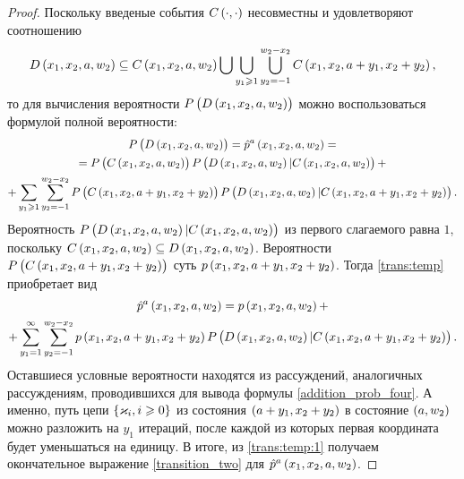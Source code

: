 \documentclass[a4paper,14pt,russian]{article}
\newcommand{\Markk}[0]{\brrr{ \vk_i, i \geqslant 0}}
\newcommand{\p}{\hat{p}}
\begin{document}
\begin{proof}
Поскольку введеные события $C\left(\cdot,\cdot\right)$ несовместны и
удовлетворяют соотношению
\begin{equation*}
 D\left(x_1,x_2, a , w_2\right) \subseteq C\left(x_1,x_2, a , w_2\right)
 \bigcup \bigcup_{y_1 \geqslant  1} \bigcup_{y_2 = -1}^{w_2-x_2} C\left(x_1,x_2, a +y_1, x_2 + y_2\right),
\end{equation*}
то для вычисления вероятности $ P\left(D\left(x_1,x_2, a , w_2\right)\right)$ можно воспользоваться формулой полной вероятности:
\begin{multline}
P\br{D\br{x_1,x_2, a , w_2}} =  \p^a \br{x_1, x_2, a, w_2} =\\=
 P\br{C\br{x_1,x_2, a, w_2}}P\br{D\br{x_1,x_2, a , w_2} | C\br{x_1,x_2, a, w_2}} +\\+
 \sum_{y_1 \geqslant 1} \sum_{y_2 = -1}^{w_2-x_2} 
  P\br{C\br{x_1,x_2, a +y_1, x_2 + y_2}}P\br{D\br{x_1,x_2, a , w_2} | C\br{x_1,x_2, a +y_1, x_2 + y_2}}.
  \label{trans:temp}
\end{multline}
Вероятность $P\left(D\left(x_1,x_2, a , w_2\right) | C\left(x_1,x_2, a, w_2\right)\right)$ из первого слагаемого равна $1$, поскольку 
$C\left(x_1,x_2, a, w_2\right) \subseteq D\left(x_1,x_2, a , w_2\right)$. Вероятности $P\left(C\left(x_1,x_2, a +y_1, x_2 + y_2\right)\right)$ суть 
$p\left(x_1, x_2, a + y_1, x_2 + y_2\right)$. Тогда \eqref{trans:temp} приобретает вид
\begin{multline}
\p^a \br{x_1, x_2, a, w_2} = p\br{x_1,x_2, a, w_2} +\\+
 \sum_{y_1 = 1}^{\infty} \sum_{y_2 = -1}^{w_2-x_2} 
 p\br{x_1,x_2, a +y_1, x_2 + y_2}P\br{D\br{x_1,x_2, a , w_2} | C\br{x_1,x_2, a +y_1, x_2 + y_2}}.
  \label{trans:temp:1}
\end{multline}
Оставшиеся условные вероятности находятся из рассуждений, аналогичных рассуждениям, проводившихся для вывода формулы 
\eqref{addition_prob_four}. А именно, путь цепи $\Markk$ из состояния $\left(a +y_1, x_2 + y_2\right)$ в состояние $\left(a , w_2\right)$ можно
разложить на $y_1$ итераций, после каждой из которых первая координата будет уменьшаться на единицу. В итоге, из 
\eqref{trans:temp:1} получаем окончательное выражение \eqref{transition_two} для $\p^a \br{x_1, x_2, a, w_2}$.
\end{proof}
\end{document}
